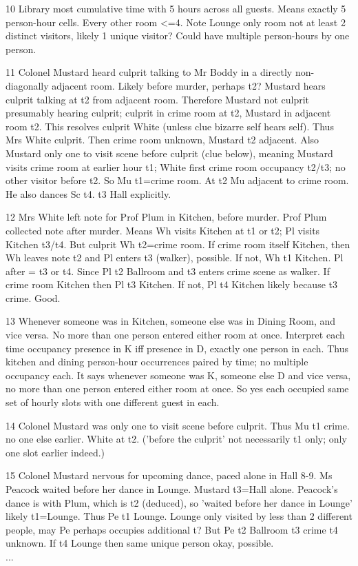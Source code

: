 \begin{tcolorbox}
10 Library most cumulative time with 5 hours across all guests. Means exactly 5 person-hour cells. Every other room <=4. Note Lounge only room not at least 2 distinct visitors, likely 1 unique visitor? Could have multiple person-hours by one person.

11 Colonel Mustard heard culprit talking to Mr Boddy in a directly non-diagonally adjacent room. Likely before murder, perhaps t2? Mustard hears culprit talking at t2 from adjacent room. Therefore Mustard not culprit presumably hearing culprit; culprit in crime room at t2, Mustard in adjacent room t2. This resolves culprit White (unless clue bizarre self hears self). Thus Mrs White culprit. Then crime room unknown, Mustard t2 adjacent. Also Mustard only one to visit scene before culprit (clue below), meaning Mustard visits crime room at earlier hour t1; White first crime room occupancy t2/t3; no other visitor before t2. So Mu t1=crime room. At t2 Mu adjacent to crime room. He also dances Sc t4. t3 Hall explicitly.

12 Mrs White left note for Prof Plum in Kitchen, before murder. Prof Plum collected note after murder. Means Wh visits Kitchen at t1 or t2; Pl visits Kitchen t3/t4. But culprit Wh t2=crime room. If crime room itself Kitchen, then Wh leaves note t2 and Pl enters t3 (walker), possible. If not, Wh t1 Kitchen. Pl after = t3 or t4. Since Pl t2 Ballroom and t3 enters crime scene as walker. If crime room Kitchen then Pl t3 Kitchen. If not, Pl t4 Kitchen likely because t3 crime. Good.

13 Whenever someone was in Kitchen, someone else was in Dining Room, and vice versa. No more than one person entered either room at once.
Interpret each time occupancy presence in K iff presence in D, exactly one person in each. Thus kitchen and dining person-hour occurrences paired by time; no multiple occupancy each. It says whenever someone was K, someone else D and vice versa, no more than one person entered either room at once. So yes each occupied same set of hourly slots with one different guest in each.

14 Colonel Mustard was only one to visit scene before culprit. Thus Mu t1 crime. no one else earlier. White at t2. ('before the culprit' not necessarily t1 only; only one slot earlier indeed.)

15 Colonel Mustard nervous for upcoming dance, paced alone in Hall 8-9. Ms Peacock waited before her dance in Lounge.
Mustard t3=Hall alone. Peacock's dance is with Plum, which is t2 (deduced), so 'waited before her dance in Lounge' likely t1=Lounge. Thus Pe t1 Lounge. Lounge only visited by less than 2 different people, may Pe perhaps occupies additional t? But Pe t2 Ballroom t3 crime t4 unknown. If t4 Lounge then same unique person okay, possible.\\
...
\end{tcolorbox}



